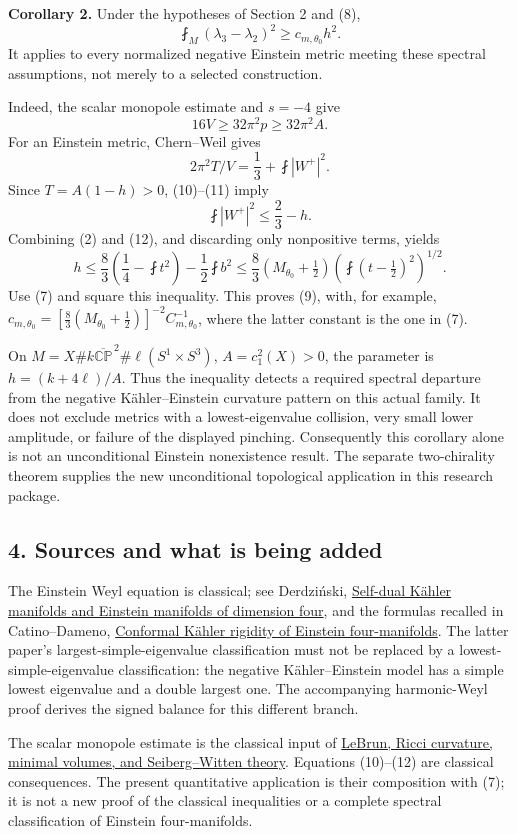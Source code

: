 \documentclass[
  11pt,
]{article}
\begin{document}
\textbf{Corollary 2.} Under the hypotheses of Section 2 and (8), \[
 \boxed{\fint_M(\lambda_3-\lambda_2)^2\ge c_{m,\theta_0}h^2.}
\tag{9}
\] It applies to every normalized negative Einstein metric meeting these
spectral assumptions, not merely to a selected construction.

Indeed, the scalar monopole estimate and \(s=-4\) give \[
 16V\ge32\pi^2p\ge32\pi^2A.
\tag{10}
\] For an Einstein metric, Chern--Weil gives \[
 2\pi^2T/V=\frac13+\fint|W^+|^2.
\tag{11}
\] Since \(T=A(1-h)>0\), (10)--(11) imply \[
 \fint|W^+|^2\le\frac23-h.
\tag{12}
\] Combining (2) and (12), and discarding only nonpositive terms, yields
\[
 h\le\frac83\left(\frac14-\fint t^2\right)-\frac12\fint b^2
   \le\frac83(M_{\theta_0}+\tfrac12)
                  \left(\fint(t-\tfrac12)^2\right)^{1/2}.
\tag{13}
\] Use (7) and square this inequality. This proves (9), with, for
example,
\(c_{m,\theta_0}=[\frac83(M_{\theta_0}+\frac12)]^{-2} C_{m,\theta_0}^{-1}\),
where the latter constant is the one in (7).

On \(M=X\#k\overline{\mathbb{CP}}^{\,2}\#\ell(S^1\times S^3)\),
\(A=c_1^2(X)>0\), the parameter is \(h=(k+4\ell)/A\). Thus the
inequality detects a required spectral departure from the negative
Kähler--Einstein curvature pattern on this actual family. It does not
exclude metrics with a lowest-eigenvalue collision, very small lower
amplitude, or failure of the displayed pinching. Consequently this
corollary alone is not an unconditional Einstein nonexistence result.
The separate two-chirality theorem supplies the new unconditional
topological application in this research package.

\hypertarget{sources-and-what-is-being-added}{%
\subsection{4. Sources and what is being
added}\label{sources-and-what-is-being-added}}

The Einstein Weyl equation is classical; see Derdziński,
\href{https://www.numdam.org/article/CM_1983__49_3_405_0.pdf}{Self-dual
Kähler manifolds and Einstein manifolds of dimension four}, and the
formulas recalled in Catino--Dameno,
\href{https://arxiv.org/abs/2607.21538}{Conformal Kähler rigidity of
Einstein four-manifolds}. The latter paper's largest-simple-eigenvalue
classification must not be replaced by a lowest-simple-eigenvalue
classification: the negative Kähler--Einstein model has a simple lowest
eigenvalue and a double largest one. The accompanying harmonic-Weyl
proof derives the signed balance for this different branch.

The scalar monopole estimate is the classical input of
\href{https://arxiv.org/abs/math/0003068}{LeBrun, Ricci curvature,
minimal volumes, and Seiberg--Witten theory}. Equations (10)--(12) are
classical consequences. The present quantitative application is their
composition with (7); it is not a new proof of the classical
inequalities or a complete spectral classification of Einstein
four-manifolds.
\end{document}
